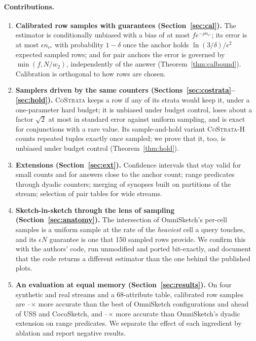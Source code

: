 \documentclass[sigconf]{acmart}
\newcommand{\cs}{\textsc{CoStrata}\xspace}
\newcommand{\csh}{\textsc{CoStrata-H}\xspace}
\newcommand{\omni}{OmniSketch\xspace}
\begin{document}
\paragraph{Contributions.}
\begin{enumerate}
\item \textbf{Calibrated row samples with guarantees (Section~\ref{sec:cal}).} The estimator is
conditionally unbiased with a bias of at most $f e^{-\rho n_{c^\star}}$; its error is at most
$\epsilon n_{c^\star}$ with probability $1-\delta$ once the anchor holds $\ln(3/\delta)/\epsilon^2$
expected sampled rows; and for pair anchors the error is governed by $\min(f,N/w_2)$, independently of the
answer (Theorem~\ref{thm:calbound}). Calibration is orthogonal to how rows are chosen.
\item \textbf{Samplers driven by the same counters (Sections~\ref{sec:costrata}--\ref{sec:hold}).} \cs
keeps a row if any of its strata would keep it, under a one-parameter hard budget; it is unbiased under
budget control, loses about a factor $\sqrt2$ at most in standard error against uniform sampling, and is exact
for conjunctions with a rare value. Its sample-and-hold variant \csh counts repeated tuples exactly once
sampled; we prove that it, too, is unbiased under budget control (Theorem~\ref{thm:hold}).
\item \textbf{Extensions (Section~\ref{sec:ext}).} Confidence intervals that stay valid for small counts and for answers close to the anchor count; range predicates through dyadic
counters; merging of synopses built on partitions of the stream; selection of pair tables for wide streams.
\item \textbf{Sketch-in-sketch through the lens of sampling (Section~\ref{sec:anatomy}).} The intersection
of \omni's per-cell samples is a uniform sample at the rate of the \emph{heaviest} cell a query touches,
and its $\epsilon N$ guarantee is one that 150 sampled rows provide. We confirm this with the authors' code,
run unmodified and ported bit-exactly, and document that the code returns a different estimator than the
one behind the published plots.
\item \textbf{An evaluation at equal memory (Section~\ref{sec:results}).} On four synthetic and
\NumRealStreams{} real streams and a 68-attribute table, calibrated row samples are
\NumOmniAnyVsBestRowLo--\NumOmniAnyVsBestRowHi$\times$ more accurate than the best of
\NumOmniFamilySize{} \omni configurations and ahead of USS and CocoSketch, and
\NumRangeBestVsOmniLo--\NumRangeBestVsOmniHi$\times$ more accurate than \omni's dyadic extension on range
predicates. We separate the effect of each ingredient by ablation and report negative results.
\end{enumerate}
\end{document}
